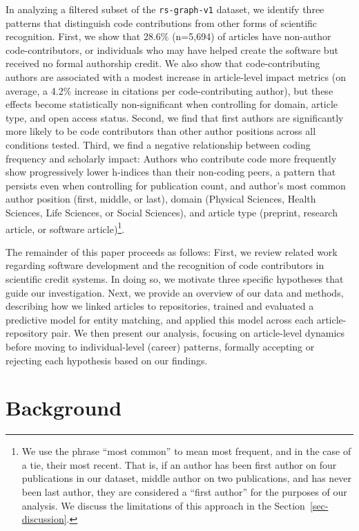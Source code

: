 \documentclass[
  number,
  3p,
  onecolumn]{elsarticle}
\begin{document}
In analyzing a filtered subset of the \texttt{rs-graph-v1} dataset, we
identify three patterns that distinguish code contributions from other
forms of scientific recognition. First, we show that 28.6\% (n=5,694) of
articles have non-author code-contributors, or individuals who may have
helped create the software but received no formal authorship credit. We
also show that code-contributing authors are associated with a modest
increase in article-level impact metrics (on average, a 4.2\% increase
in citations per code-contributing author), but these effects become
statistically non-significant when controlling for domain, article type,
and open access status. Second, we find that first authors are
significantly more likely to be code contributors than other author
positions across all conditions tested. Third, we find a negative
relationship between coding frequency and scholarly impact: Authors who
contribute code more frequently show progressively lower h-indices than
their non-coding peers, a pattern that persists even when controlling
for publication count, and author's most common author position (first,
middle, or last), domain (Physical Sciences, Health Sciences, Life
Sciences, or Social Sciences), and article type (preprint, research
article, or software article)\footnote{We use the phrase ``most common''
  to mean most frequent, and in the case of a tie, their most recent.
  That is, if an author has been first author on four publications in
  our dataset, middle author on two publications, and has never been
  last author, they are considered a ``first author'' for the purposes
  of our analysis. We discuss the limitations of this approach in the
  Section~\ref{sec-discussion}.}.

The remainder of this paper proceeds as follows: First, we review
related work regarding software development and the recognition of code
contributors in scientific credit systems. In doing so, we motivate
three specific hypotheses that guide our investigation. Next, we provide
an overview of our data and methods, describing how we linked articles
to repositories, trained and evaluated a predictive model for entity
matching, and applied this model across each article-repository pair. We
then present our analysis, focusing on article-level dynamics before
moving to individual-level (career) patterns, formally accepting or
rejecting each hypothesis based on our findings.

\section{Background}\label{sec-background}
\end{document}
